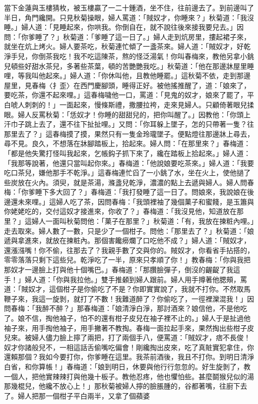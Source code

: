 \begin{showcontents}{}
當下金蓮與玉樓猜枚，被玉樓贏了一二十鍾酒，坐不住，往前邊去了。到前邊叫了半日，角門纔開。只見秋菊操眼，婦人罵道：「賊奴才，你睡來？」秋菊道：「我沒睡。」婦人道：「見睡起來，你哄我。你倒自在，就不說往後來接我要兒去。」因問：「你爹睡了？」秋菊道：「爹睡了這一日了。」婦人走到炕房里，摟起裙子來，就坐在炕上烤火。婦人要茶吃，秋菊連忙傾了一盞茶來。婦人道：「賊奴才，好乾淨手兒，你倒茶我吃！我不吃這陳茶，熬的怪泛湯氣！你叫春梅來，教他另拿小銚兒頓些好甜水茶兒，多著些茶葉，頓的苦艷艷我吃。」秋菊道：「他在那邊牀屋里睡哩，等我叫他起來。」婦人道：「你休叫他，且教他睡罷。」這秋菊不依，走到那邊屋里，見春梅〈扌歪〉在西門慶腳頭，睡得正好。被他搖推醒了，道：「娘來了，要吃茶，你還不起來哩。」這春梅噦他一口，罵道：「見鬼的奴才，娘來了罷了，平白唬人刺刺的！」一面起來，慢條斯禮，撒腰拉袴，走來見婦人。只顧倚著眼兒揉眼。婦人反罵秋菊：「恁奴才！你睡的甜甜兒的，把你叫醒了。」因教他：「你頭上汗巾子跳上去了，還不往下扯扯哩。」又問：「你耳躲上墜子，怎的只帶著一隻？往那里去了？」這春梅摸了摸，果然只有一隻金玲瓏墜子。便點燈往那邊牀上尋去，尋不見。良久，不想落在牀腳踏板上，拾起來。婦人問：「在那里來？」春梅道：「都是他失驚打怪叫我起來，乞帳鈎子抓下來了，纔在踏板上拾起來。」婦人道：「我那等說著，他還只當叫起你來。」春梅道：「他說娘要吃茶來。」婦人道：「我要吃口茶兒，嫌他那手不乾淨。」這春梅連忙舀了一小銚了水，坐在火上，使他撾了些炭放在火內。須臾，就是茶湯，滌盞兒乾淨，濃濃的點上去遞與婦人。婦人問春梅：「你爹睡下多大回了？」春梅道：「我打發睡了這一日了。問娘來，我說娘在後邊還未來哩。」這婦人吃了茶，因問春梅：「我頭裡袖了幾個菓子和蜜餞，是玉簫與你姥姥吃的，交付這奴才接進來，你收了？」春梅道：「我沒見他，知道放在那里？」這婦人一面叫秋菊問他：「菓子在那里？」秋菊道：「有，我放在揀粧內哩。」走去取來。婦人數了一數，只是少了一個柑子。問他：「那里去了？」秋菊道：「娘遞與拿進來，就放在揀粧內。那個害饞癆爛了口吃他不成？」婦人道：「賊奴才，還漲漒嘴！你不偷，往那去了？我親手數了交與你的。賊奴才，你看省手拈搭的，零零落落只剩下這些兒。乾淨吃了一半，原來只孝順了你！」教春梅：「你與我把那奴才一邊臉上打與他十個嘴巴。」春梅道：「那臢臉彈子，倒沒的齷齪了我這手！」婦人道：「你與我拉他。」雙手推顙到婦人跟前。婦人用手撙著他腮頰，罵道：「賊奴才，這個柑子是你偷吃了不是？你即實實說了，我就不打你。不然取馬鞭子來，我這一旋剝，就打了不數！我難道醉了？你偷吃了，一徑裡灤混我！」因問春梅：「我醉不醉？」那春梅道：「娘清淨白淨，那討酒來？娘信他，不是他吃了。娘不信，掏他袖子，怕不的還有柑子皮兒在袖子裡不止的。」婦人于是扯過他袖子來，用手掏他袖子，用手撇著不教掏。春梅一面拉起手來，果然掏出些柑子皮兒來。被婦人儘力臉上擰了兩把，打了兩個手八，便罵道：「賊奴才，痞不長俊！奴才你諸般兒不，一相這話舌偷嘴吃偏會！剛纔掏出皮來，吃了真賍實犯拿住，你還賴那個？我如今要打你，你爹睡在這里。我茶前酒後，我且不打你。到明日清淨白省，和你算帳！」春梅道：「娘到明日，休要與他行行忽忽的。好生旋剝了，教一個人，把他實辣辣打與他幾十板子。教他忍疼，他也懼怕些。甚麼鬬猴兒似的湯那幾棍兒，他纔不放心上！」那秋菊被婦人擰的臉脹腫的，谷都著嘴，往廚下去了。婦人把那一個柑子平白兩半，又拿了個蘋婆 
\end{showcontents}
